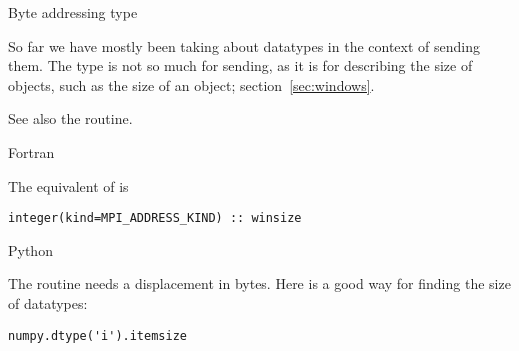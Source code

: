  {Byte addressing type}

So far we have mostly been taking about datatypes in the context of
sending them. The  type is not so much for
sending, as it is for describing the size of objects, such as the size
of an  object; section~\ref{sec:windows}.

See also the  routine.

 {Fortran}

The equivalent of  is
\lstset{style=reviewcode,language=Fortran} %
\begin{lstlisting}
integer(kind=MPI_ADDRESS_KIND) :: winsize
\end{lstlisting}
\lstset{style=reviewcode,language=C} %

 {Python}

The  routine needs a displacement in
bytes. Here is a good way for finding the size of  datatypes:
\lstset{style=reviewcode,language=Python} %
\begin{lstlisting}
numpy.dtype('i').itemsize
\end{lstlisting}
\lstset{language=C} %


